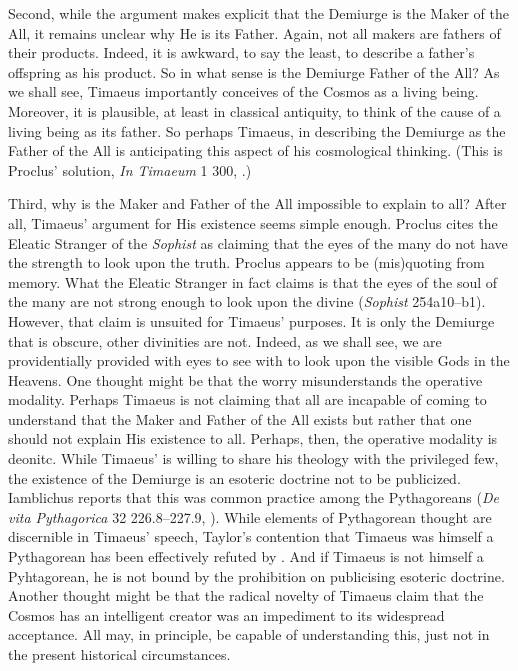 Second, while the argument makes explicit that the Demiurge is the Maker of the All, it remains unclear why He is its Father. Again, not all makers are fathers of their products. Indeed, it is awkward, to say the least, to describe a father's offspring as his product. So in what sense is the Demiurge Father of the All? As we shall see, Timaeus importantly conceives of the Cosmos as a living being. Moreover, it is plausible, at least in classical antiquity, to think of the cause of a living being as its father. So perhaps Timaeus, in describing the Demiurge as the Father of the All is anticipating this aspect of his cosmological thinking. (This is Proclus' solution, \emph{In Timaeum} 1 300, \citealt{Diehl:1903re}.)

Third, why is the Maker and Father of the All impossible to explain to all? After all, Timaeus' argument for His existence seems simple enough. Proclus cites the Eleatic Stranger of the \emph{Sophist} as claiming that the eyes of the many do not have the strength to look upon the truth. Proclus appears to be (mis)quoting from memory. What the Eleatic Stranger in fact claims is that the eyes of the soul of the many are not strong enough to look upon the divine (\emph{Sophist} 254a10--b1). However, that claim is unsuited for Timaeus' purposes. It is only the Demiurge that is obscure, other divinities are not. Indeed, as we shall see, we are providentially provided with eyes to see with to look upon the visible Gods in the Heavens. One thought might be that the worry misunderstands the operative modality. Perhaps Timaeus is not claiming that all are incapable of coming to understand that the Maker and Father of the All exists but rather that one should not explain His existence to all. Perhaps, then, the operative modality is deonitc. While Timaeus' is willing to share his theology with the privileged few, the existence of the Demiurge is an esoteric doctrine not to be publicized. Iamblichus reports that this was common practice among the Pythagoreans (\emph{De vita Pythagorica} 32 226.8--227.9, \citealt{Deubner:1937ys}). While elements of Pythagorean thought are discernible in Timaeus' speech, Taylor's \citeyearpar{Taylor:1928qb} contention that Timaeus was himself a Pythagorean has been effectively refuted by \citet{Cornford:1935fk}. And if Timaeus is not himself a Pyhtagorean, he is not bound by the prohibition on publicising esoteric doctrine. Another thought might be that the radical novelty of Timaeus claim that the Cosmos has an intelligent creator was an impediment to its widespread acceptance. All may, in principle, be capable of understanding this, just not in the present historical circumstances.


